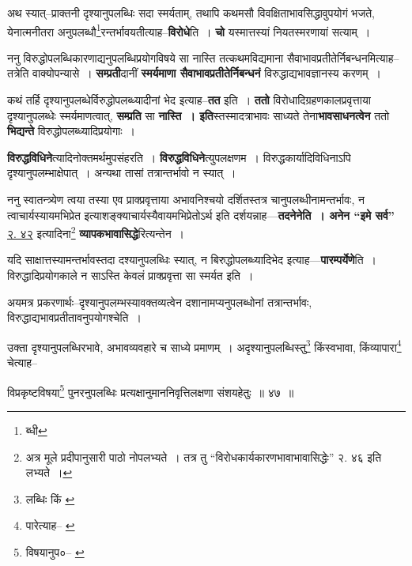 \documentclass[article,12pt,a4paper]{memoir}
\begin{document}
	  \pstart अथ स्यात्--प्राक्तनी दृश्यानुपलब्धिः सदा स्मर्यताम्, तथापि कथमसौ विवक्षिताभावसिद्धावुपयोगं भजते, येनात्मनीतरा अनुपलब्धौ\footnote{ब्धी}\-रन्तर्भावयतीत्याह--\textbf{विरोधे}ति । \textbf{चो} यस्मात्तस्यां नियतस्मरणायां सत्याम् ।
	\pend
      

	  \pstart ननु विरुद्धोपलब्धिकारणाद्यनुपलब्धिप्रयोगविषये सा नास्ति तत्कथमविद्यमाना सैवाभावप्रतीतेर्निबन्धनमित्याह--तत्रेति वाक्योपन्यासे । \textbf{सम्प्रती}दानीं \textbf{स्मर्यमाणा सैवाभावप्रतीतेर्निबन्धनं} विरुद्धाद्यभावज्ञानस्य करणम् ।
	\pend
      

	  \pstart कथं तर्हि दृश्यानुपलब्धेर्विरुद्धोपलब्ध्यादीनां भेद इत्याह--\textbf{तत} इति । \textbf{ततो} विरोधादिग्रहणकालप्रवृत्ताया दृश्यानुपलब्धेः स्मर्यमाणत्वात्, \textbf{सम्प्रति} सा \textbf{नास्ति । इति}स्तस्मादत्राभावः साध्यते तेना\textbf{भावसाधनत्वेन} ततो \textbf{भिद्यन्ते} विरुद्धोपलब्ध्यादिप्रयोगाः ।
	\pend
      

	  \pstart \textbf{विरुद्धविधिने}त्यादिनोक्तमर्थमुपसंहरति । \textbf{विरुद्धविधिने}त्युपलक्षणम । विरुद्धकार्यादिविधिनाऽपि दृश्यानुपलम्भाक्षेपात् । अन्यथा तासां तत्रान्तर्भावो न स्यात् ।
	\pend
      

	  \pstart ननु स्वातन्त्र्येण त्वया तस्या एव प्राक्प्रवृत्ताया अभावनिश्चयो दर्शितस्तत्र चानुपलब्धीनामन्तर्भावः, न त्वाचार्यस्यायमभिप्रेत इत्याशङ्क्याचार्यस्यैवायमभिप्रेतोऽर्थ इति दर्शयन्नाह—\textbf{तदनेनेति । अनेन “इमे सर्व”} \href{http://http://sarit.indology.info/?cref=2.42}{२. ४२} इत्यादिना\footnote{अत्र मूले प्रदीपानुसारी पाठो नोपलभ्यते । तत्र तु “विरोधकार्यकारणभावाभावासिद्धेः” २. ४६ इति लभ्यते ।} \textbf{व्यापकभावासिद्धे}रित्यन्तेन ।
	\pend
      

	  \pstart यदि साक्षात्तस्यामन्तर्भावस्तदा दश्यानुपलब्धिः स्यात्, न बिरुद्धोपलब्ध्यादिभेद इत्याह—\textbf{पारम्पर्येणे}ति । विरुद्धादिप्रयोगकाले न साऽस्ति केवलं प्राक्प्रवृत्ता सा स्मर्यत इति ।
	\pend
      

	  \pstart अयमत्र प्रकरणार्थः--दृश्यानुपलम्भस्यावक्तव्यत्वेन दशानामप्यनुपलब्धोनां तत्रान्तर्भावः, विरुद्धाद्यभावप्रतीतावनुपयोगश्चेति ।
	\pend
	  \bigskip
	  \begingroup
	

	  \pstart उक्ता दृश्यानुपलब्धिरभावे, अभावव्यवहारे च साध्ये प्रमाणम् । अदृश्यानुपलब्धिस्तु\footnote{लब्धिः किं \cite{dp-msA} \cite{dp-edP} \cite{dp-edH} \cite{dp-edE}} किंस्वभावा, किंव्यापारा\footnote{पारेत्याह--\cite{dp-msB} \cite{dp-msD}} चेत्याह--
	\pend
       
	  \bigskip
	  \begingroup
	

	  \pstart विप्रकृष्टविषया\footnote{विषयानुप०--\cite{dp-msB} \cite{dp-msC} \cite{dp-edH} \cite{dp-edE} \cite{dp-edN}} पुनरनुपलब्धिः प्रत्यक्षानुमाननिवृत्तिलक्षणा संशयहेतुः ॥ ४७ ॥
	\pend
      
\end{document}
